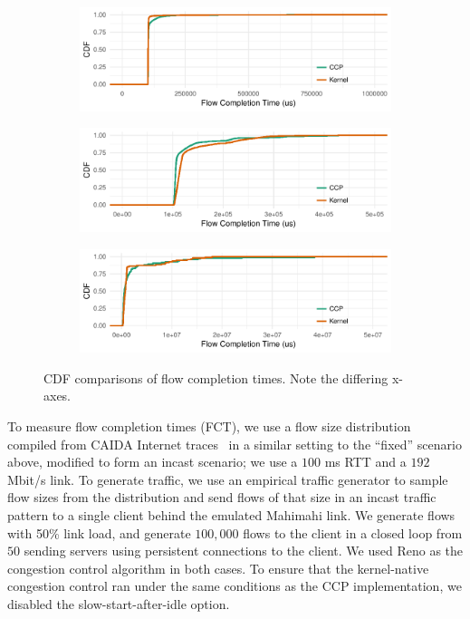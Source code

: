 \begin{figure}[t]
\centering
\begin{subfigure}{\columnwidth}
\includegraphics[width=\columnwidth]{img/small_fcts}
\label{fig:eval:fidelity:fct:sml}
\end{subfigure}
%
\begin{subfigure}{\columnwidth}
\includegraphics[width=\columnwidth]{img/med_fcts}
\label{fig:eval:fidelity:fct:med}
\end{subfigure}
%
\begin{subfigure}{\columnwidth}
\includegraphics[width=\columnwidth]{img/big_fcts}
\label{fig:eval:fidelity:fct:big}
\end{subfigure}
%
\caption{CDF comparisons of flow completion times. Note the differing x-axes.}\label{fig:eval:fidelity:fct}
\end{figure}

To measure flow completion times (FCT), we use a flow size distribution compiled from CAIDA Internet traces~\cite{caida} in a similar setting to the ``fixed'' scenario above, modified to form an incast scenario; we use a $100$ ms RTT and a $192$ Mbit/s link.
To generate traffic, we use an empirical traffic generator to sample flow sizes from the distribution and send flows of that size in an incast traffic pattern to a single client behind the emulated Mahimahi link. We generate flows with 50\% link load, and generate $100,000$ flows to the client in a closed loop from $50$ sending servers using persistent connections to the client.
We used Reno as the congestion control algorithm in both cases. To ensure that the kernel-native congestion control ran under the same conditions as the CCP implementation, we disabled the slow-start-after-idle option.

